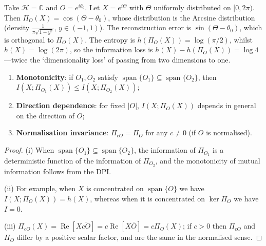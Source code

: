 \begin{example}\label{ex:dyn_uniform_projection}
Take $\mathcal H=\mathbb C$ and $O=e^{i\theta_0}$. Let $X=e^{i\Theta}$ with $\Theta$ uniformly distributed on $[0,2\pi)$. Then $\Pi_O(X)=\cos(\Theta-\theta_0)$, whose distribution is the Arcsine distribution (density $\frac{1}{\pi\sqrt{1-y^2}}$, $y\in(-1,1)$). The reconstruction error is $\sin(\Theta-\theta_0)$, which is orthogonal to $\Pi_O(X)$. The entropy is $h(\Pi_O(X))=\log(\pi/2)$, whilst $h(X)=\log(2\pi)$, so the information loss is $h(X)-h(\Pi_O(X))=\log 4$---twice the `dimensionality loss' of passing from two dimensions to one.
\end{example}

\begin{property}\label{prop:dyn_projection_compression_properties}
\begin{enumerate}[label=(\roman*)]
    \item \textbf{Monotonicity}: if $O_1,O_2$ satisfy $\operatorname{span}\{O_1\}\subseteq\operatorname{span}\{O_2\}$, then $I(X;\Pi_{O_1}(X))\le I(X;\Pi_{O_2}(X))$;
    \item \textbf{Direction dependence}: for fixed $|O|$, $I(X;\Pi_O(X))$ depends in general on the direction of $O$;
    \item \textbf{Normalisation invariance}: $\Pi_{cO}=\Pi_O$ for any $c\neq 0$ (if $O$ is normalised).
\end{enumerate}
\end{property}

\begin{proof}
(i) When $\operatorname{span}\{O_1\}\subseteq\operatorname{span}\{O_2\}$, the information of $\Pi_{O_1}$ is a deterministic function of the information of $\Pi_{O_2}$, and the monotonicity of mutual information follows from the DPI.

(ii) For example, when $X$ is concentrated on $\operatorname{span}\{O\}$ we have $I(X;\Pi_O(X))=h(X)$, whereas when it is concentrated on $\ker\Pi_O$ we have $I=0$.

(iii) $\Pi_{cO}(X)=\operatorname{Re}[X\overline{cO}]=c\operatorname{Re}[X\overline O]=c\Pi_O(X)$; if $c>0$ then $\Pi_{cO}$ and $\Pi_O$ differ by a positive scalar factor, and are the same in the normalised sense.
\end{proof}

